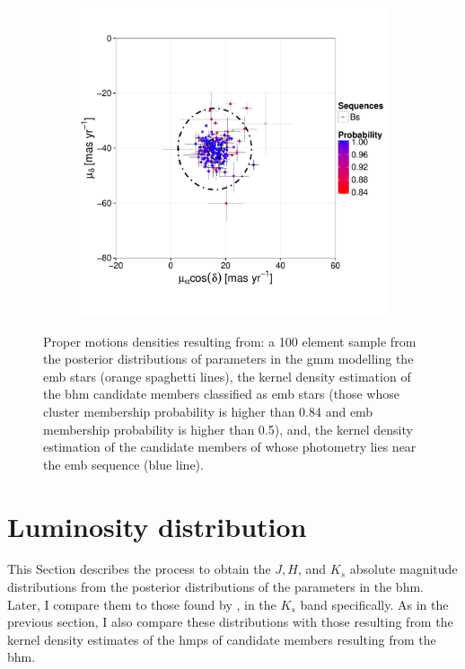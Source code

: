 \begin{figure}[ht!]
\begin{subfigure}[t]{0.45\textwidth}
     \includegraphics[page=3,width=\textwidth]{background/Figures/BHM/Bs_members.pdf}
        \caption{}
    \end{subfigure}
\caption{Proper motions densities resulting from: a 100 element sample from the posterior distributions of parameters in the \gls{gmm} modelling the \gls{emb} stars (orange spaghetti lines), the kernel density estimation of the \gls{bhm} candidate members classified as \gls{emb} stars (those whose cluster membership probability is higher than 0.84 and \gls{emb} membership probability is higher than 0.5), and, the kernel density estimation of the candidate members of \citet{Bouy2015} whose photometry lies near the \gls{emb} sequence (blue line).}
\label{fig:PMBs}
\end{figure}

\section{Luminosity distribution}
\label{sect:luminosity}
This Section describes the process to obtain the $J,H$, and $K_s$ absolute magnitude distributions from the posterior distributions of the parameters in the \gls{bhm}. Later, I compare them to those found by \citet{Bouy2015}, in the $K_s$ band specifically. As in the previous section, I also compare these distributions with those resulting from the kernel density estimates of the \gls{hmps} of candidate members resulting from the \gls{bhm}.

